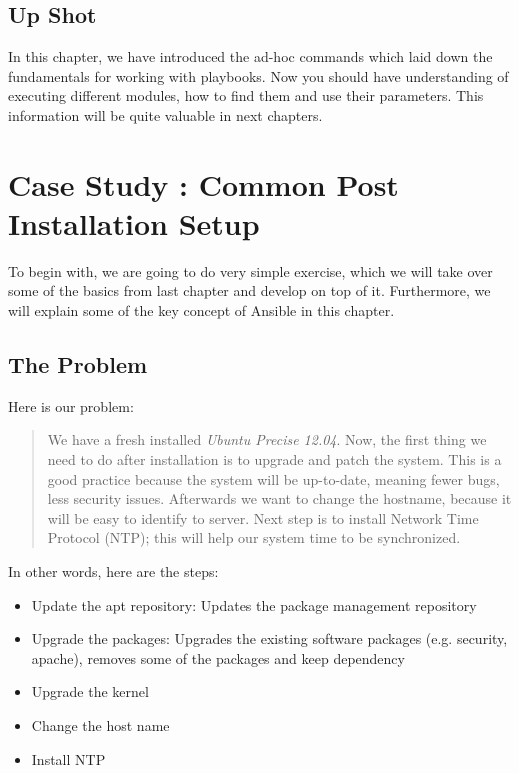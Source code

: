 \documentclass[10pt]{book}
\begin{document}
\section{Up Shot}
In this chapter, we have introduced the ad-hoc commands which laid down the 
fundamentals for working with playbooks. Now you should have understanding of executing different modules, 
how to find them and use their parameters. This information will be quite 
valuable in next chapters.









\chapter{Case Study : Common Post Installation Setup}
\label{chap-common-post-installation-setup}
To begin with, we are going to do very simple exercise, which we will take over some of the basics from 
last chapter and develop on top of it. Furthermore, we will explain some of the key concept of Ansible in 
this chapter.

\section{The Problem}
Here is our problem:

\begin{quote}
 We have a fresh installed \emph{Ubuntu Precise 12.04}. Now, the first thing we need to do after installation 
 is to upgrade and patch the system. This is a good practice because the system will be 
 up-to-date, meaning fewer bugs, less security issues. Afterwards we want to change the 
 hostname, because it will be easy to identify to server. Next step is to install 
 Network Time Protocol (NTP); this will help our system time to be synchronized. 
\end{quote}

In other words, here are the steps:
\begin{itemize}
\item Update the apt repository: Updates the package management repository
\item Upgrade the packages: Upgrades the existing software packages (e.g. security, apache), 
removes some of the packages and keep dependency
\item Upgrade the kernel 
\item Change the host name
\item Install NTP
\end{itemize}
\end{document}
